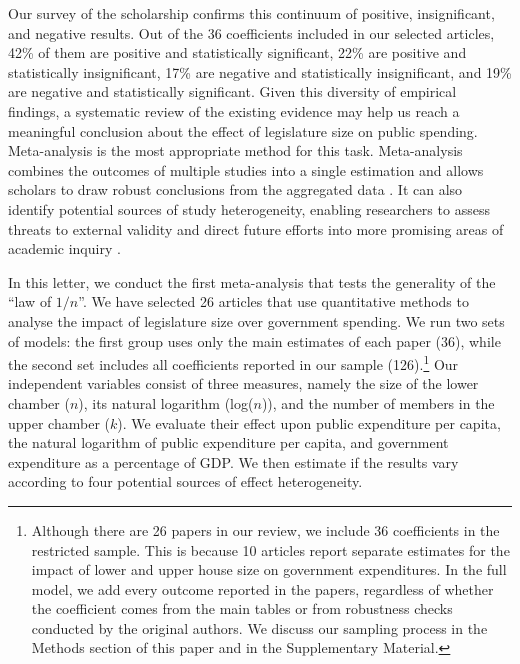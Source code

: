 \documentclass[a4paper,12pt]{article}
\begin{document}
Our survey of the scholarship confirms this continuum of positive,
insignificant, and negative results. Out of the 36 coefficients included in our
selected articles, 42\% of them are positive and statistically significant, 22\%
are positive and statistically insignificant, 17\% are negative and
statistically insignificant, and 19\% are negative and statistically
significant. Given this diversity of empirical findings, a systematic review of
the existing evidence may help us reach a meaningful conclusion about the effect
of legislature size on public spending. Meta-analysis is the most appropriate
method for this task. Meta-analysis combines the outcomes of multiple studies
into a single estimation and allows scholars to draw robust conclusions from the
aggregated data \citep{cooper2019handbook,hedges1985statistical}. It can also
identify potential sources of study heterogeneity, enabling researchers to
assess threats to external validity and direct future efforts into more
promising areas of academic inquiry \citep{doucouliagos2008democracy}.

In this letter, we conduct the first meta-analysis that tests the generality of
the ``law of $1/n$''. We have selected 26 articles that use quantitative methods
to analyse the impact of legislature size over government spending. We run two
sets of models: the first group uses only the main estimates of each paper (36),
while the second set includes all coefficients reported in our sample
(126).\footnote{Although there are 26 papers in our review, we include 36
coefficients in the restricted sample. This is because 10 articles report
separate estimates for the impact of lower and upper house size on government
expenditures. In the full model, we add every outcome reported in the
papers, regardless of whether the coefficient comes from the main tables or
from robustness checks conducted by the original authors. We discuss our
sampling process in the Methods section of this paper and in the Supplementary
Material.} Our independent variables consist of three measures, namely the size
of the lower chamber ($n$), its natural logarithm (log($n$)), and the number of
members in the upper chamber ($k$). We evaluate their effect upon public
expenditure per capita, the natural logarithm of public expenditure per capita,
and government expenditure as a percentage of GDP. We then estimate if the
results vary according to four potential sources of effect heterogeneity.
\end{document}
